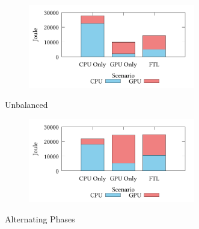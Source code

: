 \documentclass[]{article}
\begin{document}
\setcounter{figure}{1}
\renewcommand{\thefigure}{\arabic{figure}b}
\begin{figure}[!h]
\centering
\begin{subfigure}[b]{\mysize}
\centering
\includegraphics[width=0.8\textwidth]{figures_original/balanced.energy.pdf}
\renewcommand{\thesubfigure}{Original}
\caption{}
\end{subfigure}
\begin{subfigure}[b]{\mysize}
\centering
{}
\renewcommand{\thesubfigure}{Reproduced}
\caption{}
\end{subfigure}
\caption{Unbalanced}
\end{figure}



\setcounter{figure}{1}
\renewcommand{\thefigure}{\arabic{figure}c}
\begin{figure}[!h]
\centering
\begin{subfigure}[b]{\mysize}
\centering
\includegraphics[width=0.8\textwidth]{figures_original/alternating.energy.pdf}
\renewcommand{\thesubfigure}{Original}
\caption{}
\end{subfigure}
\begin{subfigure}[b]{\mysize}
\centering
{}
\renewcommand{\thesubfigure}{Reproduced}
\caption{}
\end{subfigure}
\caption{Alternating Phases}
\end{figure}
\end{document}
